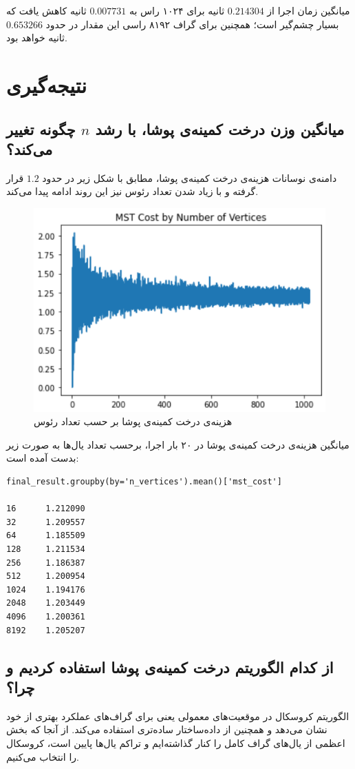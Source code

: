 \documentclass{article}
\begin{document}
میانگین زمان اجرا از
$0.214304$
ثانیه برای ۱۰۲۴ راس به
$0.007731$
ثانیه کاهش یافت که بسیار چشم‌گیر است؛ همچنین برای گراف ۸۱۹۲ راسی این مقدار در حدود
$0.653266$
ثانیه خواهد بود.

\section{نتیجه‌گیری}
\subsection{میانگین وزن درخت کمینه‌ی پوشا، با رشد 
$n$
چگونه تغییر می‌کند؟}
دامنه‌ی نوسانات هزینه‌ی درخت کمینه‌ی پوشا، مطابق با شکل زیر در حدود
$1.2$
قرار گرفته و با زیاد شدن تعداد رئوس نیز این روند ادامه پیدا می‌کند.

\begin{figure}[H]
    \centering
    \includegraphics[width=0.6\linewidth]{Photos/Randomized mst/mst_cost.png}
    \caption{
    هزینه‌ی درخت کمینه‌ی پوشا بر حسب تعداد رئوس
    }
    \label{fig:my_label}
\end{figure}

میانگین هزینه‌ی درخت کمینه‌ی پوشا در ۲۰ بار اجرا، برحسب تعداد یال‌ها به صورت زیر بدست آمده است:

\begin{latin}
\begin{verbatim}
final_result.groupby(by='n_vertices').mean()['mst_cost']

16      1.212090
32      1.209557
64      1.185509
128     1.211534
256     1.186387
512     1.200954
1024    1.194176
2048    1.203449
4096    1.200361
8192    1.205207
\end{verbatim}
\end{latin}
\subsection{از کدام الگوریتم درخت کمینه‌ی پوشا استفاده کردیم و چرا؟}
الگوریتم کروسکال در موقعیت‌های معمولی یعنی برای گراف‌های
عملکرد بهتری از خود نشان می‌دهد و همچنین از داده‌ساختار ساده‌تری استفاده می‌کند. از آنجا که بخش اعظمی از یال‌های گراف کامل را کنار گذاشته‌ایم و تراکم یال‌ها پایین است، کروسکال را انتخاب می‌کنیم.
\end{document}
